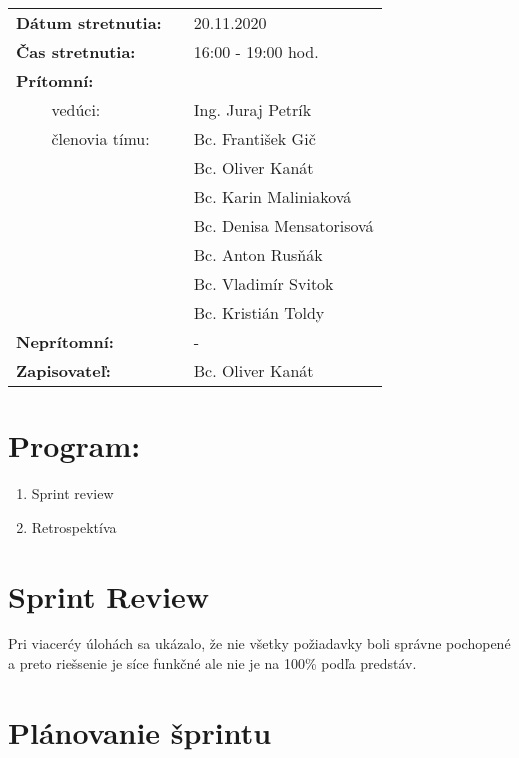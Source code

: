 \documentclass{article}
\begin{document}
    

    \begin{table}[h]
        \begin{tabular}{lllll}
            \multicolumn{3}{l}{\textbf{Dátum stretnutia:}} & & 20.11.2020 \\
            \multicolumn{3}{l}{\textbf{Čas stretnutia:}} & & 16:00 - 19:00 hod. \\
            \multicolumn{3}{l}{\textbf{Prítomní:}} \\
            & & vedúci: & & Ing. Juraj Petrík \\
            & & členovia tímu: & & Bc. František Gič  \\
            & & & & Bc. Oliver Kanát \\
            & & & & Bc. Karin Maliniaková \\
            & & & & Bc. Denisa Mensatorisová \\
            & & & & Bc. Anton Rusňák \\
            & & & & Bc. Vladimír Svitok \\
            & & & & Bc. Kristián Toldy \\
            \multicolumn{3}{l}{\textbf{Neprítomní:}} & & -\\
            \multicolumn{3}{l}{\textbf{Zapisovateľ:}} & & Bc. Oliver Kanát \\
        \end{tabular}
        \label{tab:grades}
    \end{table}

    \section*{Program:}
    
    \begin{enumerate}
        \item Sprint review 
        \item Retrospektíva
    \end{enumerate}

    \section*{Sprint Review}

        \textnormal {Pri viacerćy úlohách sa ukázalo, že nie všetky požiadavky boli správne pochopené a preto riešsenie je síce funkčné ale nie je na 100\% podľa predstáv. }

    \section*{Plánovanie šprintu}
\end{document}
